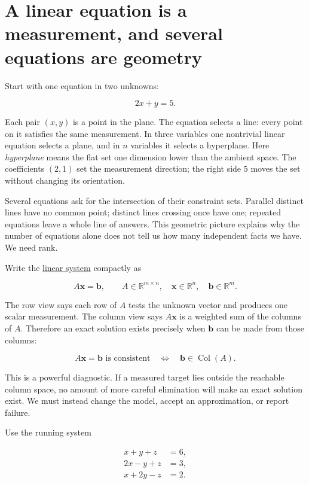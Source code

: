 \section{A linear equation is a measurement, and several equations are geometry}\label{01-foundations-i-ch019-a-linear-equation-is-a-measurement-and-several-equations-are-geometry}

Start with one equation in two unknowns:

\[
2x+y=5.
\]

Each pair \((x,y)\) is a point in the plane. The equation selects a line: every point on it satisfies the same measurement. In three variables one nontrivial linear equation selects a plane, and in \(n\) variables it selects a hyperplane. Here \emph{hyperplane} means the flat set one dimension lower than the ambient space. The coefficients \((2,1)\) set the measurement direction; the right side \(5\) moves the set without changing its orientation.

Several equations ask for the intersection of their constraint sets. Parallel distinct lines have no common point; distinct lines crossing once have one; repeated equations leave a whole line of answers. This geometric picture explains why the number of equations alone does not tell us how many independent facts we have. We need rank.

Write the \hyperref[01-foundations-i-ch019-a-system-is-an-intersection-of-constraints]{linear system} compactly as

\[
A\mathbf x=\mathbf b,
\qquad A\in\mathbb R^{m\times n},\quad
\mathbf x\in\mathbb R^n,\quad\mathbf b\in\mathbb R^m.
\]

The row view says each row of \(A\) tests the unknown vector and produces one scalar measurement. The column view says \(A\mathbf x\) is a weighted sum of the columns of \(A\). Therefore an exact solution exists precisely when \(\mathbf b\) can be made from those columns:

\[
A\mathbf x=\mathbf b\text{ is consistent}
\quad\Longleftrightarrow\quad
\mathbf b\in\operatorname{Col}(A).
\]

This is a powerful diagnostic. If a measured target lies outside the reachable column space, no amount of more careful elimination will make an exact solution exist. We must instead change the model, accept an approximation, or report failure.

Use the running system

\[
\begin{aligned}
x+y+z&=6,\\
2x-y+z&=3,\\
x+2y-z&=2.
\end{aligned}
\]

